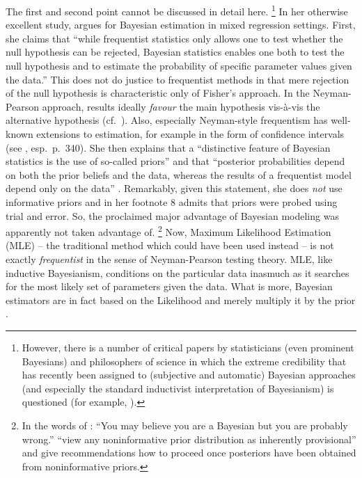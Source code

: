 \documentclass[USenglish]{article}
\begin{document}
The first and second point cannot be discussed in detail here.%
\footnote{However, there is a number of critical papers by statisticians (even prominent Bayesians) and philosophers of science in which the extreme credibility that has recently been assigned to (subjective and automatic) Bayesian approaches (and especially the standard inductivist interpretation of Bayesianism) is questioned (for example, \citealp{GelmanShalizi2013,Mayo2011,Senn2011}).}
In her otherwise excellent study, \citet[251--252]{Levshina2016} argues for Bayesian estimation in mixed regression settings.
First, she claims that ``while frequentist statistics only allows one to test whether the null hypothesis can be rejected, Bayesian statistics enables one both to test the null hypothesis and to estimate the probability of specific parameter values given the data.''
This does not do justice to frequentist methods in that mere rejection of the null hypothesis is characteristic only of Fisher's approach.
In the Neyman-Pearson approach, results ideally \textit{favour} the main hypothesis vis-à-vis the alternative hypothesis (cf.\ \citealp{Lehmann1993,Lehmann2011,Perezgonzalez2015}).
Also, especially Neyman-style frequentism has well-known extensions to estimation, for example in the form of confidence intervals (see \citealp{GreenlandEa2016}, esp.\ p.\ 340).
She then explains that a ``distinctive feature of Bayesian statistics is the use of so-called priors'' and that ``posterior probabilities depend on both the prior beliefs and the data, whereas the results of a frequentist model depend only on the data'' \cite[252]{Levshina2016}.
Remarkably, given this statement, she does \textit{not} use informative priors and in her footnote 8 \cite[252]{Levshina2016} admits that priors were probed using trial and error.
So, the proclaimed major advantage of Bayesian modeling was apparently not taken advantage of.%
\footnote{In the words of \cite{Senn2011}: ``You may believe you are a Bayesian but you are probably wrong.''
\citet[347--348]{GelmanHill2006} ``view any noninformative prior distribution as inherently provisional'' and give recommendations how to proceed once posteriors have been obtained from noninformative priors.}
Now, Maximum Likelihood Estimation (MLE) -- the traditional method which could have been used instead -- is not exactly \textit{frequentist} in the sense of Neyman-Pearson testing theory.
MLE, like inductive Bayesianism, conditions on the particular data inasmuch as it searches for the most likely set of parameters given the data.
What is more, Bayesian estimators are in fact based on the Likelihood and merely multiply it by the prior \citep[6--8]{GelmanEa2014}.
\end{document}
